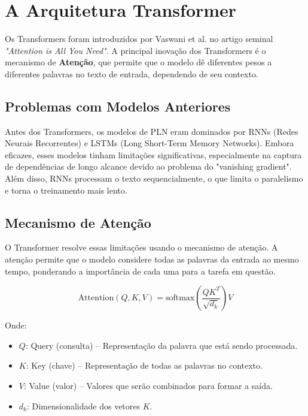 \documentclass[14pt,a4paper,oneside]{book}
\begin{document}
\section{A Arquitetura Transformer}

Os Transformers foram introduzidos por Vaswani et al. no artigo seminal \textit{"Attention is All You Need"}. A principal inovação dos Transformers é o mecanismo de \textbf{Atenção}, que permite que o modelo dê diferentes pesos a diferentes palavras no texto de entrada, dependendo de seu contexto.

\subsection{Problemas com Modelos Anteriores}

Antes dos Transformers, os modelos de PLN eram dominados por RNNs (Redes Neurais Recorrentes) e LSTMs (Long Short-Term Memory Networks). Embora eficazes, esses modelos tinham limitações significativas, especialmente na captura de dependências de longo alcance devido ao problema do "vanishing gradient". Além disso, RNNs processam o texto sequencialmente, o que limita o paralelismo e torna o treinamento mais lento.

\subsection{Mecanismo de Atenção}

O Transformer resolve essas limitações usando o mecanismo de atenção. A atenção permite que o modelo considere todas as palavras da entrada ao mesmo tempo, ponderando a importância de cada uma para a tarefa em questão.

\begin{equation}
	\text{Attention}(Q, K, V) = \text{softmax}\left(\frac{QK^T}{\sqrt{d_k}}\right)V
\end{equation}

Onde:
\begin{itemize}
	\item $Q$: Query (consulta) – Representação da palavra que está sendo processada.
	\item $K$: Key (chave) – Representação de todas as palavras no contexto.
	\item $V$: Value (valor) – Valores que serão combinados para formar a saída.
	\item $d_k$: Dimensionalidade dos vetores $K$.
\end{itemize}
\end{document}
